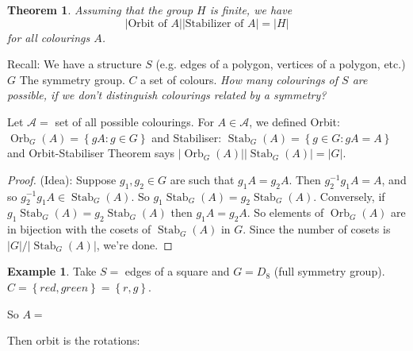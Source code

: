 \documentclass{article}
\newtheorem{theorem}{Theorem}
\theoremstyle{definition} \newtheorem*{definition}{Definition}
\newtheorem*{exmp}{Example} \newtheorem*{exmps}{Examples}
\DeclareMathOperator{\Orb}{Orb} \DeclareMathOperator{\Stab}{Stab}
\begin{document}
 \begin{theorem} Assuming that the group $H$ is finite, we have \[
   \big|\text{Orbit of }A\big| \big|\text{Stabilizer of } A\big|=\big|H\big| \]
   for all colourings $A$.
  
   \label{thm:orbitstabilizer} \end{theorem}

 Recall: We have a structure $S$ (e.g. edges of a polygon, vertices of a
 polygon, etc.) $G$ The symmetry group. $C$ a set of colours. \emph{How many
 colourings of $S$ are possible, if we don't distinguish colourings related by
 a symmetry?}

 Let $\mathcal{A}=$ set of all possible colourings. For $A \in \mathcal{A}$, we
 defined Orbit: $\Orb_G(A)=\left\{ gA : g \in G \right\}$ and Stabiliser:
 $\Stab_G(A) = \left\{ g \in G : gA = A \right\}$ and Orbit-Stabiliser Theorem
 says $|\Orb_G(A)||\Stab_G(A)|=|G|$.

 \begin{proof} (Idea): Suppose $g_1,g_2\in G$ are such that $g_1A=g_2A$. Then
   $g_2^{-1}g_1A=A$, and so $g_2^{-1}g_1A \in \Stab_G(A)$. So
   $g_1\Stab_G(A)=g_2\Stab_G(A)$. Conversely, if $g_1\Stab_G(A)=g_2\Stab_G(A)$
   then $g_1A=g_2A$. So elements of $\Orb_G(A)$ are in bijection with the
   cosets of $\Stab_G(A)$ in $G$. Since the number of cosets is
   $|G|/|\Stab_G(A)|$, we're done.  \end{proof} 

 \begin{exmp} Take $S=$ edges of a square and $G=D_8$ (full symmetry group). $C
   = \left\{ red, green \right\}=\left\{ r,g \right\}$. 
   
   So $A=$ \begin{figure}[h] \centering {}
     \label{fig:coloursquare} \end{figure}
 
 \end{exmp}

  Then orbit is the rotations:
\end{document}
